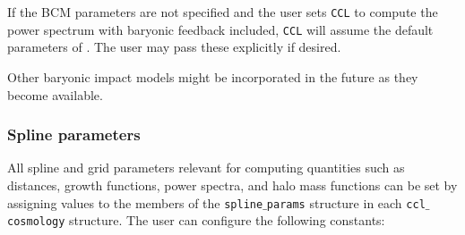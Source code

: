 \documentclass[\docopts]{\docclass}
\newcommand{\ccl}{{\tt CCL}\xspace}
\begin{document}
If the BCM parameters are not specified and the user sets \ccl to compute the power spectrum with baryonic feedback included, \ccl will assume the default parameters of \citet{Schneider15}. The user may pass these explicitly if desired.

Other baryonic impact models might be incorporated in the future as they become available.

\subsubsection{Spline parameters}

All spline and grid parameters relevant for computing quantities such as distances, growth functions, power spectra, and halo mass functions can be set by assigning values to the members of the {\tt spline$\_$params} structure in each {\tt ccl$\_$cosmology} structure.
The user can configure the following constants:
\end{document}
